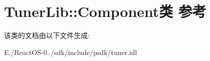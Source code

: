 \hypertarget{class_tuner_lib_1_1_component}{}\section{Tuner\+Lib\+:\+:Component类 参考}
\label{class_tuner_lib_1_1_component}


该类的文档由以下文件生成\+:\begin{DoxyCompactItemize}
\item 
E\+:/\+React\+O\+S-\/0../sdk/include/psdk/tuner.\+idl\end{DoxyCompactItemize}
